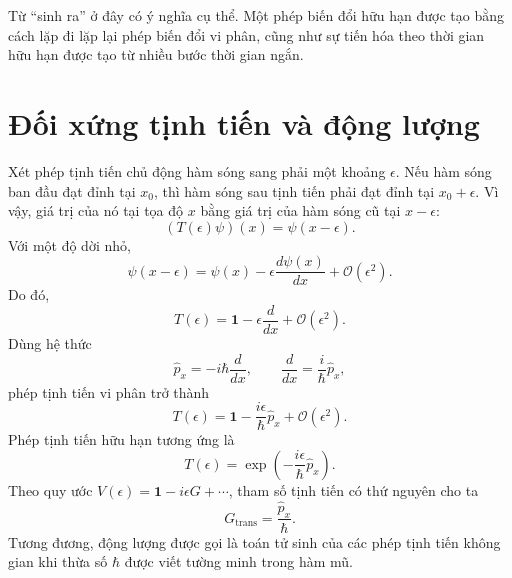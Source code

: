 Từ ``sinh ra'' ở đây có ý nghĩa cụ thể. Một phép biến đổi hữu hạn được tạo bằng cách lặp đi lặp lại phép biến đổi vi phân, cũng như sự tiến hóa theo thời gian hữu hạn được tạo từ nhiều bước thời gian ngắn.

\section{Đối xứng tịnh tiến và động lượng}

Xét phép tịnh tiến chủ động hàm sóng sang phải một khoảng \(\epsilon\). Nếu hàm sóng ban đầu đạt đỉnh tại \(x_0\), thì hàm sóng sau tịnh tiến phải đạt đỉnh tại \(x_0+\epsilon\). Vì vậy, giá trị của nó tại tọa độ \(x\) bằng giá trị của hàm sóng cũ tại \(x-\epsilon\):
\begin{equation}
(T(\epsilon)\psi)(x)=\psi(x-\epsilon).
\end{equation}
Với một độ dời nhỏ,
\begin{equation}
\psi(x-\epsilon)
=
\psi(x)-\epsilon\frac{d\psi(x)}{dx}
+\mathcal O(\epsilon^2).
\end{equation}
Do đó,
\begin{equation}
T(\epsilon)
=
\mathbf 1-\epsilon\frac{d}{dx}
+\mathcal O(\epsilon^2).
\end{equation}
Dùng hệ thức
\begin{equation}
\hat p_x=-i\hbar\frac{d}{dx},
\qquad
\frac{d}{dx}=\frac{i}{\hbar}\hat p_x,
\end{equation}
phép tịnh tiến vi phân trở thành
\begin{equation}
T(\epsilon)
=
\mathbf 1-\frac{i\epsilon}{\hbar}\hat p_x
+\mathcal O(\epsilon^2).
\end{equation}
Phép tịnh tiến hữu hạn tương ứng là
\begin{equation}
T(\epsilon)
=
\exp\left(-\frac{i\epsilon}{\hbar}\hat p_x\right).
\end{equation}
Theo quy ước \(V(\epsilon)=\mathbf 1-i\epsilon G+\cdots\), tham số tịnh tiến có thứ nguyên cho ta
\begin{equation}
G_{\mathrm{trans}}=\frac{\hat p_x}{\hbar}.
\end{equation}
Tương đương, động lượng được gọi là toán tử sinh của các phép tịnh tiến không gian khi thừa số \(\hbar\) được viết tường minh trong hàm mũ.

\begin{classroomqa}
\end{classroomqa}

